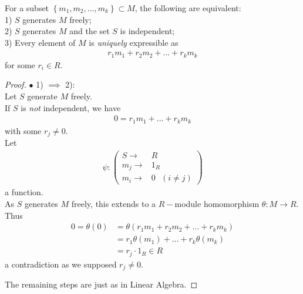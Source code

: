 \documentclass[a4paper]{article}
\begin{document}
\begin{prop}
For a subset $\left\{m_1,m_2,...,m_k\right\} \subset M$, the following are equivalent:\\
1) $S$ generates $M$ freely;\\
2) $S$ generates $M$ and the set $S$ is independent;\\
3) Every element of $M$ is \emph{uniquely} expressible as
\begin{equation*}
\begin{aligned}
r_1 m_1 + r_2 m_2 + ... + r_k m_k
\end{aligned}
\end{equation*}
for some $r_i \in R$.
\begin{proof}
$\bullet$ 1) $\implies$ 2):\\
Let $S$ generate $M$ freely.\\
If $S$ is \emph{not} independent, we have
\begin{equation*}
\begin{aligned}
0=r_1 m_1 + ... + r_k m_k
\end{aligned}
\end{equation*}
with some $r_j \neq 0$.\\
Let
\begin{equation*}
\begin{aligned}
\psi: \left(
\begin{array}{ll}
S \to &R\\
m_j \to &1_R\\
m_i \to &0  \text{  } (i \neq j)
\end{array}
\right)
\end{aligned}
\end{equation*}
a function.\\
As $S$ generates $M$ freely, this extends to a $R-$module homomorphism $\theta: M\to R$. Thus
\begin{equation*}
\begin{aligned}
0=\theta\left(0\right) &= \theta\left(r_1 m_1 + r_2 m_2 + ... + r_k m_k\right)\\
&= r_1 \theta\left(m_1\right) + ... + r_k \theta \left(m_k\right)\\
&= r_j\cdot 1_R \in R
\end{aligned}
\end{equation*}
a contradiction as we supposed $r_j \neq 0$.

The remaining steps are just as in Linear Algebra.
\end{proof}
\end{prop}
\end{document}
